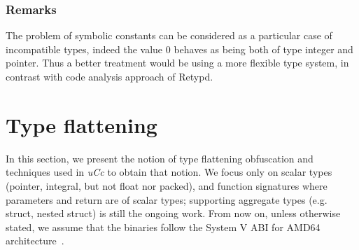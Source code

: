 \documentclass[compsoc,conference,a4paper,10pt,times]{IEEEtran}
\begin{document}
\subsubsection*{Remarks}
The problem of symbolic constants can be considered as a particular case of incompatible types, indeed the value 
$0$ behaves as being both of type integer and pointer. Thus a better treatment would be using a more
flexible type system, in contrast with code analysis approach of Retypd.




\section{Type flattening}
\noindent
In this section, we present the notion of type flattening obfuscation and techniques 
used in \emph{uCc} to obtain that notion. We focus only on scalar types (pointer, integral, 
but not float nor packed), and function signatures where parameters and return are of scalar types; supporting aggregate types
(e.g. struct, nested struct) is still the ongoing work. From now on, unless otherwise stated, 
we assume that the binaries follow the System V ABI for AMD64 architecture~\cite{lu_system_nodate}.
\end{document}
